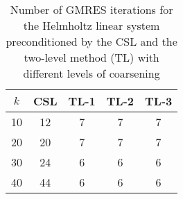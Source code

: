 \begin{table}[t]
\centering
\begin{tabular}{ccccc}
\hline
$k$ & CSL & TL-1 & TL-2 & TL-3 \\ \hline
10 & 12 & 7 & 7 & 7 \\
20 & 20 & 7 & 7 & 7 \\
30 & 24 & 6 & 6 & 6 \\
40 & 44 & 6 & 6 & 6 \\
\hline
\end{tabular}
\caption{Number of GMRES iterations for the Helmholtz linear system preconditioned by the  CSL and the two-level method (TL) with different levels of coarsening}
\label{table:gmres_csl_vs_adef_coarse_eps_5}
\end{table}
